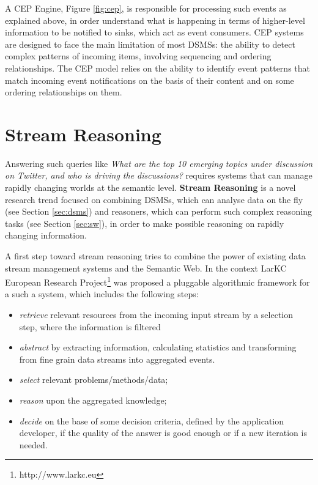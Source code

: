 A CEP Engine, Figure \ref{fig:cep}, is responsible for processing such events as explained above, in order understand what is happening in terms of higher-level information to be notified to sinks, which act as event consumers. CEP systems are designed to face the main limitation of most DSMSs: the ability to detect complex patterns of incoming items, involving sequencing and ordering relationships. The CEP model relies on the ability to identify event patterns that match incoming event notifications on the basis of their content and on some ordering relationships on them.


\section{Stream Reasoning}\label{sec:sfp}

Answering such queries like \textit{What are the top 10 emerging topics under discussion on Twitter, and who is driving the discussions?} requires systems that can manage rapidly changing worlds at the semantic level. \textbf{Stream Reasoning} is a novel research trend focused on combining DSMSs, which can analyse data on the fly (see Section \ref{sec:dsms}) and reasoners, which can perform such complex reasoning tasks (see Section \ref{sec:sw}), in order to make possible reasoning on rapidly changing information.

A first step toward stream reasoning \cite{DBLP:conf/fis/ValleCBBC08} tries to combine the power of existing data stream management systems and the Semantic Web. In the context LarKC European Research Project\footnote{http://www.larkc.eu} \cite{4597242, 4120457} was proposed a pluggable algorithmic framework for a such a system, which includes the following steps:
\begin{itemize}
\item[1.] \textit{retrieve} relevant resources from the incoming input stream by a selection step, where the information is filtered
\item[2.] \textit{abstract} by extracting information, calculating statistics and transforming from fine grain data streams into aggregated events.
\item[3.] \textit{select} relevant problems/methods/data;
\item[4.] \textit{reason} upon the aggregated knowledge; 
\item[5.] \textit{decide} on the base of some decision criteria, defined by the application developer, if the quality of the answer is good enough or if a new iteration is needed.
\end{itemize} 


